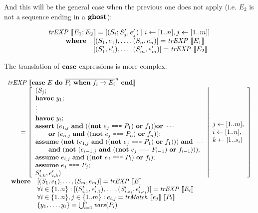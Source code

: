 And this will be the general case when the previous one does not apply (i.e.
$E_2$ is not a sequence ending in a $\textbf{ghost}$):

\[
\begin{array}{l}
\mathit{trEXP}~\llbracket E_1;E_2\rrbracket = [(S_i;S_j',e'_j) \mid i \leftarrow [1..n], j \leftarrow [1..m]] \\
\qquad 
\begin{array}{ll}
\textbf{where} & [(S_1,e_1),\dots,(S_n, e_n)] = \mathit{trEXP}~\llbracket E_1\rrbracket \\
& [(S_1',e'_1),\dots,(S_m', e'_m)] = \mathit{trEXP}~\llbracket E_2\rrbracket \\
\end{array}
\end{array}
\]

The translation of $\textbf{case}$ expressions is more complex:

\[
\begin{array}{l}
\mathit{trEXP}~\llbracket\textbf{case}~E~\textbf{do}~\overline{P_i~\textbf{when}~f_i \rightarrow E_i}^n~\textbf{end}\rrbracket\\
\qquad = \left[ \begin{array}{l}
(S_j;\\
\textbf{havoc}~y_{1};\\
\vdots\\
\textbf{havoc}~y_{t};\\
\textbf{assert}~(e_{1,j}~\textbf{and}~((\textbf{not}~e_j~\texttt{===}~P_1)~\textbf{or}~f_1))\textbf{or}~\cdots\\
\quad\quad\textbf{or}~(e_{n,j}~\textbf{and}~((\textbf{not}~e_j~\texttt{===}~P_n)~\textbf{or}~f_n)); \\
\textbf{assume}~(\textbf{not}~(e_{1,j}~\textbf{and}~((\textbf{not}~e_j~\texttt{===}~P_1)~\textbf{or}~f_1)))~\textbf{and}~\cdots\\
\quad\quad\textbf{and}~(\textbf{not}~(e_{i-1,j}~\textbf{and}~((\textbf{not}~e_j~\texttt{===}~P_{i - 1})~\textbf{or}~f_{i - 1}))); \\
\textbf{assume}~e_{i,j}~\textbf{and}~((\textbf{not}~e_j~\texttt{===}~P_{i})~\textbf{or}~f_{i});\\
\textbf{assume}~e_j~\texttt{===}~P_j; \\
S_{i,k}', e_{i,k}')
\end{array}  \middle\vert
\begin{array}{l}
j \leftarrow [1..m], \\
i \leftarrow [1..n], \\
k \leftarrow [1..s_i] \\
\end{array}
\right]\\
\begin{array}{ll}
\textbf{where} & [(S_1,e_1),\ldots,(S_m,e_m)] = \mathit{trEXP}~\llbracket E\rrbracket \\
& \forall i \in \{1..n\}: [(S'_{i,1},e'_{i,1}),\ldots,(S'_{i,s_i},e'_{i,s_i})] = \mathit{trEXP}~\llbracket E_i\rrbracket \\
& \forall i \in \{1..n\}, j \in \{1..m\}: e_{i,j} = \mathit{trMatch}~\llbracket e_j\rrbracket~\llbracket P_i\rrbracket \\
& \{y_{1}, \ldots, y_{t}\} = \bigcup_{i = 1}^n\mathit{vars}(P_i) \\
\end{array}
\end{array}
\]

